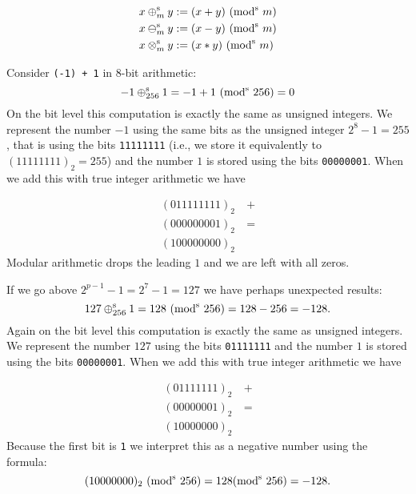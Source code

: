 \begin{align*}
x \ensuremath{\oplus}_{m}^{\rm s} y &:= (x+y)\ ({\rm mod}^{\rm s}\ m) \\
x \ensuremath{\ominus}_{m}^{\rm s} y &:= (x-y)\ ({\rm mod}^{\rm s}\ m) \\
x \ensuremath{\otimes}_{m}^{\rm s} y &:= (x*y)\ ({\rm mod}^{\rm s}\ m)
\end{align*}
\begin{example} Consider \texttt{(-1) + 1} in 8-bit arithmetic:
\[
-1 \ensuremath{\oplus}_{256}^{\rm s} 1 = -1 + 1 \ ({\rm mod}^{\rm s}\ 256) = 0
\]
On the bit level this computation is exactly the same as unsigned integers. We represent the number $-1$ using the same bits as the unsigned integer $2^8 - 1 = 255$, that is  using the bits \texttt{11111111} (i.e., we store it equivalently to  $(11111111)_2 = 255$) and the  number $1$ is stored using the bits \texttt{00000001}. When we add this with true integer arithmetic we have


\begin{align*}
(0 11111111)_2 &\ + \\
(0 00000001)_2 &\ = \\
(1 00000000)_2&
\end{align*}
Modular arithmetic drops the leading $1$ and we are left with all zeros. \end{example}

\begin{example} If we go above $2^{p-1}-1 = 2^7 - 1 = 127$  we have perhaps unexpected results:
\[
127 \ensuremath{\oplus}_{256}^{\rm s} 1 = 128\  ({\rm mod}^{\rm s}\ 256) = 128 - 256 = -128.
\]
Again on the bit level this computation is exactly the same as unsigned integers. We represent the number $127$ using the bits \texttt{01111111} and the  number $1$ is stored using the bits \texttt{00000001}. When we add this with true integer arithmetic we have


\begin{align*}
(01111111)_2 &\ + \\
(00000001)_2 &\ = \\
(10000000)_2&
\end{align*}
Because the first bit is \texttt{1} we interpret this as a negative number using the formula:
\[
(10000000)_2\ ({\rm mod}^{\rm s}\ 256) = 128   ({\rm mod}^{\rm s}\ 256) = -128.
\]
\end{example}

